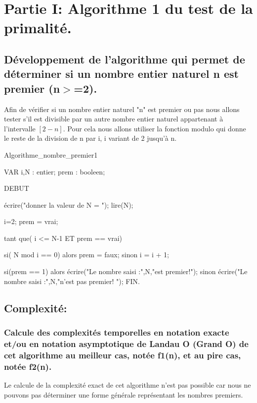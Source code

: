 \documentclass[12pt]{article}
\begin{document}
\def\reportnumber{2}
\def\reporttitle{Algorithmes de Complexités temporelles linéaire O(n) et racine carrée O($\sqrt{n}$).}


\section{Partie I: Algorithme 1 du test de la primalité.}

\subsection{Développement de l'algorithme qui permet de déterminer  si un nombre entier naturel n est premier (n$>$=2). }
Afin de vérifier si un nombre entier naturel "n" est premier ou pas nous allons tester s'il est divisible par un autre nombre entier naturel appartenant à l'intervalle $[2 - n]$.
Pour cela nous allons utiliser la fonction modulo qui donne le reste de la division de n par i, i variant de 2 jusqu'à n.


\begin{sql}

 Algorithme_nombre_premier1

 VAR
 i,N : entier;
 prem : booleen;
 
 DEBUT
 
	écrire("donner la valeur de N = ");
	lire(N);

	i=2;
	prem = vrai;

	tant que( i <= N-1 ET prem == vrai){

		si( N mod i == 0)
			alors 
				prem = faux;				
			sinon
				i = i + 1;
	}

	si(prem == 1)
    	alors
        	écrire("Le nombre saisi :",N,"est premier!");
    	sinon
        	écrire("Le nombre saisi :",N,"n'est pas premier! ");
 FIN. 
 
\end{sql}

\subsection{Complexité:}

\subsubsection{Calcule des complexités temporelles en notation exacte et/ou en notation asymptotique de Landau O (Grand O) de  cet  algorithme au meilleur cas, notée f1(n), et au pire cas, notée f2(n). }
Le calcule de la complexité exact de cet algorithme n'est pas possible car nous ne pouvons pas déterminer une forme générale représentant les nombres premiers.
 
\end{document}
